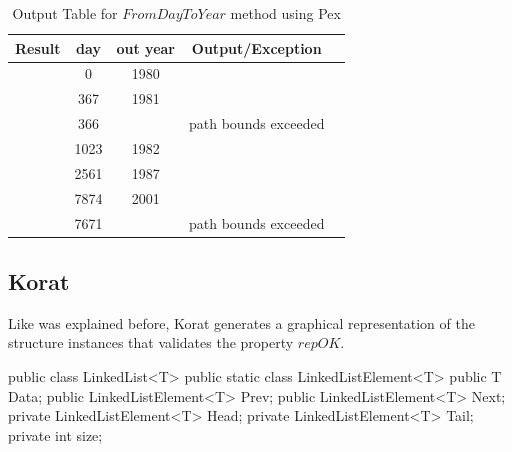 \begin{code}
\begin{table}[!ht]
\renewcommand{\arraystretch}{1.3}
\centering
\noindent \begin{tabular}{|c|c|c|c|c|}\hline
\textbf{Result} & \textbf{day} & \textbf{out year} & \textbf{Output/Exception}\\\hline
\checkK & 0 & 1980 & \\\hline
\checkK & 367 & 1981 & \\\hline
\bigexclaim & 366 & & path bounds exceeded\\\hline
\checkK & 1023 & 1982 &\\\hline
\checkK & 2561 & 1987 & \\\hline
\checkK & 7874 & 2001 & \\\hline
\bigexclaim &  7671 & & path bounds exceeded\\\hline
\end{tabular}
\caption{Output Table for $FromDayToYear$ method using Pex}\label{tab:leap}
\end{table}

\subsection{Korat}
Like was explained before, Korat generates a graphical representation of the structure instances that validates the property $repOK$.

\begin{code}[{LinkedList class in JAVA},label=lst:lljava]
public class LinkedList<T> {
  public static class LinkedListElement<T> {
    public T Data;
    public LinkedListElement<T> Prev;
    public LinkedListElement<T> Next;
  }
  private LinkedListElement<T> Head;
  private LinkedListElement<T> Tail;
  private int size; 
}
\end{code}

\def\t#1#2#3#4{\langle#1 \ #2 : #3 \ : #4 \ \rangle}
\def\d#1#2#3{\langle#1 \ #2 :: #3 \ \rangle}
\newcommand{\subseteqL}{\mathbin{\subseteq\mkern-4mu\subseteq}}
\newcommand{\inL}{\mathbin{\in\mkern-4mu\in}}


\end{code}
